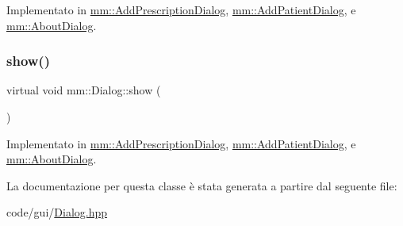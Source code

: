 Implementato in \mbox{\hyperlink{classmm_1_1_add_prescription_dialog_a6ace04587432a197436bb04c7b68d60d}{mm\+::\+Add\+Prescription\+Dialog}}, \mbox{\hyperlink{classmm_1_1_add_patient_dialog_a64c8c2ea3b1c69a858f4eaec1854270a}{mm\+::\+Add\+Patient\+Dialog}}, e \mbox{\hyperlink{classmm_1_1_about_dialog_a21f5b0a7c9d8e43baab78e073d7ade2b}{mm\+::\+About\+Dialog}}.

\mbox{\label{classmm_1_1_dialog_afda4b0dc7c0ac027c4b8fdb95713700f}} 
\subsubsection{\texorpdfstring{show()}{show()}}
{\footnotesize\ttfamily virtual void mm\+::\+Dialog\+::show (\begin{DoxyParamCaption}{ }\end{DoxyParamCaption})\hspace{0.3cm}{\ttfamily [pure virtual]}}



Implementato in \mbox{\hyperlink{classmm_1_1_add_prescription_dialog_aa1c86141b2d45e141684bd99d557b8e4}{mm\+::\+Add\+Prescription\+Dialog}}, \mbox{\hyperlink{classmm_1_1_add_patient_dialog_a0247912794984eb19c43842ab9037708}{mm\+::\+Add\+Patient\+Dialog}}, e \mbox{\hyperlink{classmm_1_1_about_dialog_a9e06dc12f6950b74ccf6ccece693f108}{mm\+::\+About\+Dialog}}.



La documentazione per questa classe è stata generata a partire dal seguente file\+:\begin{DoxyCompactItemize}
\item 
code/gui/\mbox{\hyperlink{_dialog_8hpp}{Dialog.\+hpp}}\end{DoxyCompactItemize}
